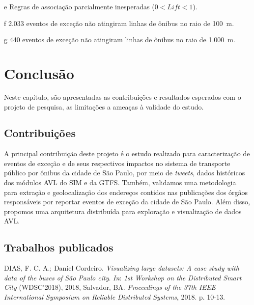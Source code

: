 \documentclass[
	12pt,				%
	oneside,			%
	a4paper,			%
	english,			%
	brazil				%
	]{abntex2ppgsi}
\begin{document}
{{{\begin{table}[!htb]
\begin{threeparttable}
\begin{tablenotes}
            \item[e] Regras de associação parcialmente inesperadas ($0 < Lift < 1$).
            \item[f] 2.033 eventos de exceção não atingiram linhas de ônibus no raio de 100~m.
            \item[g] 440 eventos de exceção não atingiram linhas de ônibus no raio de 1.000~m.
        \end{tablenotes}
\end{threeparttable}
\end{table}




\chapter{Conclusão}
\label{conclusion}

Neste capítulo, são apresentadas as contribuições e resultados esperados com o projeto de pesquisa, as limitações a ameaças à validade do estudo. 

\section{Contribuições}

A principal contribuição deste projeto é o estudo realizado para caracterização de eventos de exceção e de seus respectivos impactos no sistema de transporte público por ônibus da cidade de São Paulo, por meio de \textit{tweets}, dados históricos dos módulos AVL do SIM e da GTFS. %
Também, validamos uma metodologia para extração e geolocalização dos endereços contidos nas publicações dos órgãos responsáveis por reportar eventos de exceção da cidade de São Paulo. Além disso, propomos uma arquitetura distribuída para exploração e visualização de dados AVL.

\section{Trabalhos publicados}

DIAS, F. C. A.; Daniel Cordeiro. \textit{Visualizing large datasets: A case study with data of the buses of São Paulo city}. \textit{In}: \textit{1st Workshop on the Distributed Smart City} (WDSC'2018), 2018, Salvador, BA. \textit{Proceedings of the 37th IEEE International Symposium on Reliable Distributed Systems}, 2018. p. 10-13.

}}}
\end{document}
